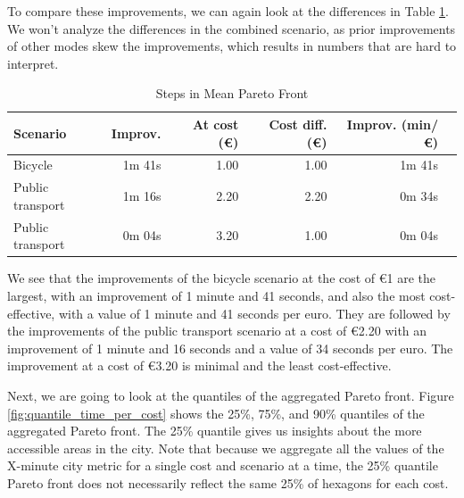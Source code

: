 To compare these improvements, we can again look at the differences in Table \ref{tab:differences_in_mean_pareto_front}.
We won't analyze the differences in the combined scenario, as prior improvements of other modes skew the improvements, which results in numbers that are hard to interpret.

\begin{table}
  \caption{Steps in Mean Pareto Front}
  \label{tab:differences_in_mean_pareto_front}
  \begin{center}
    \begin{tabular}{|l|r|r|r|r|l|}
     \hline
     Scenario & Improv. & At cost (\euro) & Cost diff. (\euro) & Improv. (min/\euro) \\
     \hline
     Bicycle & 1m 41s & 1.00 & 1.00 & 1m 41s \\
     \hline
     Public transport & 1m 16s & 2.20 & 2.20 & 0m 34s \\
     \hline
     Public transport & 0m 04s & 3.20 & 1.00 & 0m 04s \\
     \hline
    \end{tabular}
  \end{center}
\end{table}

We see that the improvements of the bicycle scenario at the cost of \euro{1} are the largest, with an improvement of 1 minute and 41 seconds, and also the most cost-effective, with a value of 1 minute and 41 seconds per euro.
They are followed by the improvements of the public transport scenario at a cost of \euro{2.20} with an improvement of 1 minute and 16 seconds and a value of 34 seconds per euro.
The improvement at a cost of \euro{3.20} is minimal and the least cost-effective.

Next, we are going to look at the quantiles of the aggregated Pareto front.
Figure \ref{fig:quantile_time_per_cost} shows the 25\%, 75\%, and 90\% quantiles of the aggregated Pareto front.
The 25\% quantile gives us insights about the more accessible areas in the city.
Note that because we aggregate all the values of the X-minute city metric for a single cost and scenario at a time, the 25\% quantile Pareto front does not necessarily reflect the same 25\% of hexagons for each cost.

